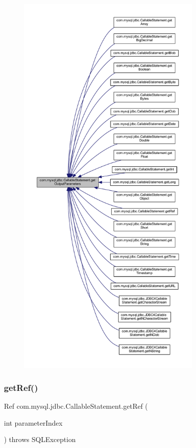 \begin{figure}[H]
\begin{center}
\leavevmode
\includegraphics[height=550pt]{classcom_1_1mysql_1_1jdbc_1_1_callable_statement_a1182e743ef39610d0aaa8cda05648433_icgraph}
\end{center}
\end{figure}
\mbox{\label{classcom_1_1mysql_1_1jdbc_1_1_callable_statement_a8c00f111b4c99ac186f1b25164c8f97a}} 
\subsubsection{\texorpdfstring{get\+Ref()}{getRef()}\hspace{0.1cm}{\footnotesize\ttfamily [1/2]}}
{\footnotesize\ttfamily Ref com.\+mysql.\+jdbc.\+Callable\+Statement.\+get\+Ref (\begin{DoxyParamCaption}\item[{int}]{parameter\+Index }\end{DoxyParamCaption}) throws S\+Q\+L\+Exception}

